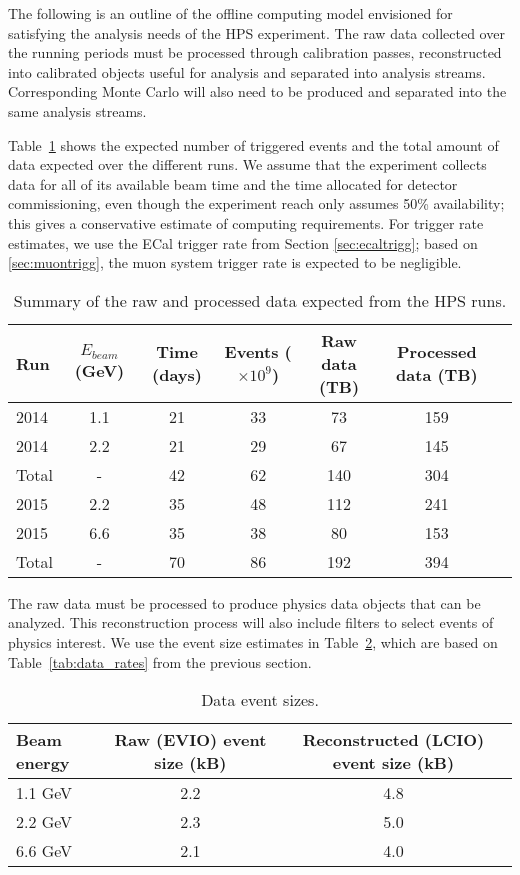 
The following is an outline of the offline computing model envisioned for satisfying the analysis needs of the HPS experiment. The raw data collected over the running periods must be processed through calibration passes, reconstructed into calibrated objects useful for analysis and separated into analysis streams. Corresponding Monte Carlo will also need to be produced and separated into the same analysis streams.

Table~\ref{tab:data_volume} shows the expected number of triggered events and
the total amount of data expected over the 
different runs. 
We assume that the experiment collects data for all of its available beam time and the time allocated for detector commissioning, even though the experiment reach only assumes 50\% availability; this gives a conservative estimate of computing requirements. 
For trigger rate estimates, we use the ECal trigger rate from Section \ref{sec:ecaltrigg}; based on \ref{sec:muontrigg}, the muon system trigger rate is expected to be negligible.
\begin{table}[]
\centering
\begin{tabular}{|l|c|c|c|c|c|c|}
\hline
Run & $E_{beam}$ (GeV) & Time (days) & Events ($\times 10^9$) & Raw data (TB) & Processed data (TB)\\
\hline
2014 & 1.1 & 21 & 33 & 73 & 159 \\
2014 & 2.2 & 21 & 29 & 67 & 145  \\
\hline
Total & - & 42 & 62 & 140 & 304 \\
\hline
2015 & 2.2 & 35 & 48 & 112 & 241 \\
2015 & 6.6 & 35 & 38 & 80 & 153 \\
\hline
Total & - & 70 & 86 & 192 & 394 \\
\hline
\end{tabular}
\caption{{\small Summary of the raw and processed data expected from the HPS runs. }}
\label{tab:data_volume}
\end{table}

The raw data must be processed to produce physics data objects that can be analyzed. 
This reconstruction process will also include filters to select events of physics interest. We use the event size estimates 
in Table~\ref{tab:raw_data_size}, which are based on Table~\ref{tab:data_rates} from the previous section. 
\begin{table}[]
\centering
\begin{tabular}{|l|c|c|}
\hline
Beam energy & Raw (EVIO) event size (kB) & Reconstructed (LCIO) event size (kB) \\ 
\hline
1.1 GeV  &  2.2 & 4.8 \\
2.2 GeV  &  2.3 & 5.0 \\
6.6 GeV  &  2.1 & 4.0 \\
\hline
\end{tabular}
\caption{{\small Data event sizes. }}
\label{tab:raw_data_size}
\end{table}

